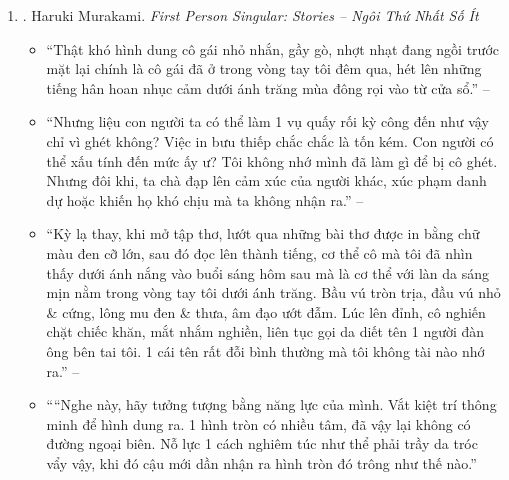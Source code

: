 \documentclass{article}
\begin{document}
\begin{enumerate}
\begin{itemize}
		\item ``The versatile \& prolific {\sc Murakami} collects 8 1st-person stories that affirm his obsessions -- American pop music \& magical realism, baseball \& sex -- yet break new literary ground. From a messy hookup to an imaginary {\sc Charlie Parker} album to a monkey masseur, the Japanese maestro taps the weirdness of the everyday, exposing conflicts that simmer within us all.'' -- {\sc Oprah Daily}
	\end{itemize}
	{\sf About the Author.} {\sc Haruki Murakami} was born in Kyoto in 1949 \& now lives near Tokyo. His work has been translated into $> 50$ languages, \& the most recent of his many international honors is the Hans Christian Andersen Literature Award, whose previous recipients include Karl Ove Knausgård, Isabel Allende, \& Salman Rushdie.

	\item \cite{Murakami_ngoi_1}. {\sc Haruki Murakami}. {\it First Person Singular: Stories -- Ngôi Thứ Nhất Số Ít}\hfill{\sf[done]}
	\begin{itemize}
		\item ``Thật khó hình dung cô gái nhỏ nhắn, gầy gò, nhợt nhạt đang ngồi trước mặt lại chính là cô gái đã ở trong vòng tay tôi đêm qua, hét lên những tiếng hân hoan nhục cảm dưới ánh trăng mùa đông rọi vào từ cửa sổ.'' -- \cite[Trên Gối Đá, p. 14]{Murakami_ngoi_1}
		\item ``Nhưng liệu con người ta có thể làm 1 vụ quấy rối kỳ công đến như vậy chỉ vì ghét không? Việc in bưu thiếp chắc chắc là tốn kém. Con người có thể xấu tính đến mức ấy ư? Tôi không nhớ mình đã làm gì để bị cô ghét. Nhưng đôi khi, ta chà đạp lên cảm xúc của người khác, xúc phạm danh dự hoặc khiến họ khó chịu mà ta không nhận ra.'' -- \cite[Kem, pp. 34--35]{Murakami_ngoi_1}
		\item ``Kỳ lạ thay, khi mở tập thơ, lướt qua những bài thơ được in bằng chữ màu đen cỡ lớn, sau đó đọc lên thành tiếng, cơ thể cô mà tôi đã nhìn thấy dưới ánh nắng vào buổi sáng hôm sau mà là cơ thể với làn da sáng mịn nằm trong vòng tay tôi dưới ánh trăng. Bầu vú tròn trịa, đầu vú nhỏ \& cứng, lông mu đen \& thưa, âm đạo ướt đẫm. Lúc lên đỉnh, cô nghiến chặt chiếc khăn, mắt nhắm nghiền, liên tục gọi da diết tên 1 người đàn ông bên tai tôi. 1 cái tên rất đỗi bình thường mà tôi không tài nào nhớ ra.'' -- \cite[Trên Gối Đá, p. 19]{Murakami_ngoi_1}
		\item ````Nghe này, hãy tưởng tượng bằng năng lực của mình. Vắt kiệt trí thông minh để hình dung ra. 1 hình tròn có nhiều tâm, đã vậy lại không có đường ngoại biên. Nỗ lực 1 cách nghiêm túc như thể phải trầy da tróc vẩy vậy, khi đó cậu mới dần nhận ra hình tròn đó trông như thế nào.''


\end{itemize}
\end{enumerate}
\end{document}

